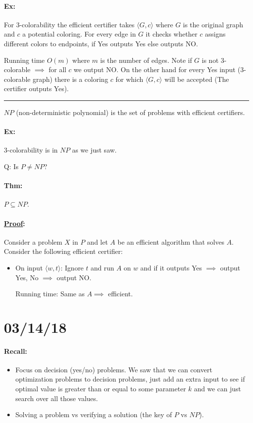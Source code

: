 \documentclass[12 pt]{article}
\begin{document}
          \paragraph{Ex:} For 3-colorability the efficient certifier
          takes $\langle G, c \rangle$ where $G$ is the original graph
          and $c$ a potential coloring. For every edge in $G$ it
          checks whether $c$ assigns different colors to endpoints, if
          Yes outputs Yes else outputs NO.

          Running time $O(m)$ where $m$ is the number of edges. Note
          if $G$ is not 3-colorable $\implies$ for all $c$ we output
          NO. On the other hand for every Yes input (3-colorable
          graph) there is a coloring $c$ for which $\langle G, c
          \rangle$ will be accepted (The certifier outputs Yes).
          \\ \noindent \rule{\textwidth}{0.5pt}
          $NP$ (non-deterministic polynomial) is the set of problems
          with efficient certifiers.
          \paragraph{Ex:} 3-colorability is in $NP$ as we just saw.

          Q: Is $P \neq NP$?
          \paragraph{Thm:} $P \subseteq NP$.
          \paragraph{\underline{Proof}:} Consider a problem $X$ in $P$
          and let $A$ be an efficient algorithm that solves
          $A$. Consider the following efficient certifier:
          \begin{itemize}
          \item On input $\langle w, t \rangle$: Ignore $t$ and run
            $A$ on $w$ and if it outputs Yes $\implies $ output Yes,
            No $\implies$ output NO.

            Running time: Same as $A \implies$ efficient.
          \end{itemize}
          \section{03/14/18}
          \paragraph{Recall:}
          \begin{itemize}
          \item Focus on decision (yes/no) problems. We saw that we
            can convert optimization problems to decision problems,
            just add an extra input to see if optimal value is greater
            than or equal to some parameter $k$ and we can just search
            over all those values.
          \item Solving a problem vs verifying a solution (the key of
            $P$ vs $NP$).
          \end{itemize}
\end{document}
